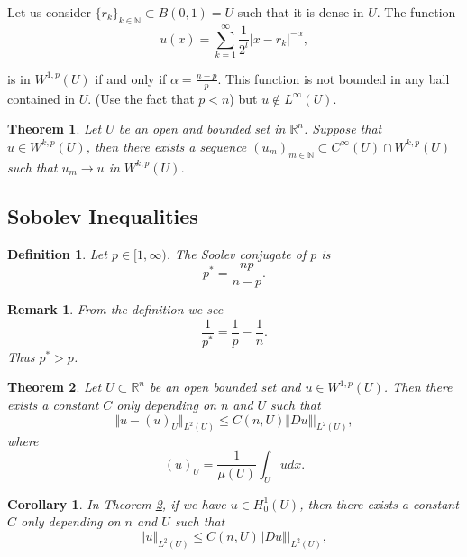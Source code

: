 \documentclass{article}
\newtheorem{theorem}{Theorem}[section]
\newtheorem{definition}{Definition}[section]
\newtheorem{remark}{Remark}[section]
\newtheorem{corollary}{Corollary}[section]
\numberwithin{equation}{section}
\begin{document}
Let us consider $\{r_k\}_{k\in\mathbb{N}}\subset B(0,1)=U$ such that it is dense in $U$. The function 
\begin{equation*}
u(x) = \sum_{k=1}^\infty {\frac 1 {2^l}}|x-r_k|^{-\alpha},
\end{equation*}

is in $W^{1,p}(U)$ if and only if $\alpha={\frac {n-p} {p}}$. This function is not bounded in any ball contained in $U$. (Use the fact that $p<n$) but $u\not\in L^\infty(U)$. 

\begin{theorem}
Let $U$ be an open and bounded set in $\mathbb{R}^n$. Suppose that $u\in W^{k,p}(U)$, then there exists a sequence $(u_m)_{m\in\mathbb{N}}\subset C^\infty(U)\cap W^{k,p}(U)$ such that $u_m\to u$ in $W^{k,p}(U)$. 
\end{theorem}

\subsection{Sobolev Inequalities}

\begin{definition}
Let $p\in[1,\infty)$. The Soolev conjugate of $p$ is 
\begin{equation*}
p^* = {\frac {np} {n-p}}.
\end{equation*} 
\end{definition}

\begin{remark}
From the definition we see 
\begin{equation*}
{\frac 1 {p^*}} = {\frac 1 p}-{\frac 1 n}.
\end{equation*}
Thus $p^*>p$.
\end{remark}

\begin{theorem}
\label{poincare_ineq}
Let $U\subset \mathbb{R}^n$ be an open bounded set and $u\in W^{1,p}(U)$. Then there exists a constant $C$ only depending on $n$ and $U$ such that
\begin{equation*}
\Vert u - (u)_U\Vert_{L^2(U)}\leq C(n,U)\Vert Du\Vert|_{L^2(U)},
\end{equation*}
where 
\begin{equation*}
(u)_U={\frac 1 {\mu(U)}}\int_U udx.
\end{equation*}
\end{theorem}

\begin{corollary}
In Theorem \ref{poincare_ineq}, if we have $u\in H_0^1(U)$, then there exists a constant $C$ only depending on $n$ and $U$ such that
\begin{equation*}
\Vert u \Vert_{L^2(U)}\leq C(n,U)\Vert Du\Vert|_{L^2(U)},
\end{equation*}
\end{corollary}
\end{document}
